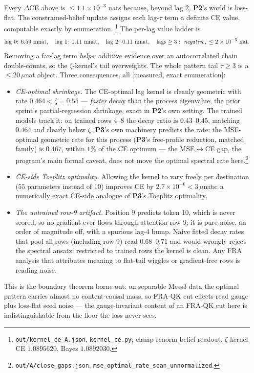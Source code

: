 \documentclass{article}
\newcommand{\htag}[1]{{\normalfont\sffamily\footnotesize[#1]}}
\newcommand{\Ptwo}{\textbf{P2}}
\newcommand{\Pthree}{\textbf{P3}}
\begin{document}
Every $\Delta$CE above is $\le1.1\times10^{-3}$ nats because, beyond lag 2, \Ptwo's
world is loss-flat. The constrained-belief update assigns each lag-$\tau$ term a
definite CE value, computable exactly by enumeration.%
\footnote{\texttt{out/kernel\_ce\_A.json}, \texttt{kernel\_ce.py}; clamp-renorm
belief readout. $\zeta$-kernel CE $1.0895620$, Bayes $1.0892030$.}
The per-lag value ladder is
\begin{equation}\label{eq:ladder}
\text{lag 0: } 6.59\text{ mnat},\quad
\text{lag 1: } 1.11\text{ mnat},\quad
\text{lag 2: } 0.11\text{ mnat},\quad
\text{lags}\ge3:\ \text{\emph{negative}},\ \le2\times10^{-5}\ \text{nat}.
\end{equation}
Removing a far-lag term \emph{helps}: additive evidence over an autocorrelated chain
double-counts, so the $\zeta$-kernel's tail overweights. The whole pattern tail
$\tau\ge3$ is a $\le20\,\mu$nat object. Three consequences, all
\htag{measured, exact enumeration}:
\begin{itemize}
\item \emph{CE-optimal shrinkage.} The CE-optimal lag kernel is cleanly geometric
with rate $0.464<\zeta=0.55$ --- \emph{faster} decay than the process eigenvalue,
the prior sprint's partial-regression shrinkage, exact in \Ptwo's own setting. The
trained models track it: on trained rows $4$--$8$ the decay ratio is $0.43$--$0.45$,
matching $0.464$ and clearly below $\zeta$. \Pthree's own machinery predicts the rate:
the MSE-optimal geometric rate for this process (\Pthree's free-profile reduction,
matched family) is $0.467$, within $1\%$ of the CE optimum --- the
MSE$\leftrightarrow$CE gap, the program's main formal caveat, does not move the optimal
spectral rate here.\footnote{\texttt{out/A/close\_gaps.json},
\texttt{mse\_optimal\_rate\_scan\_unnormalized}.}
\item \emph{CE-side Toeplitz optimality.} Allowing the kernel to vary freely per
destination ($55$ parameters instead of $10$) improves CE by
$2.7\times10^{-6}<3\,\mu$nats: a numerically exact CE-side analogue of \Pthree's
Toeplitz optimality.
\item \emph{The untrained row-9 artifact.} Position 9 predicts token 10, which is
never scored, so no gradient ever flows through attention row 9; it is pure noise, an
order of magnitude off, with a spurious lag-4 bump. Naive fitted decay rates that
pool all rows (including row 9) read $0.68$--$0.71$ and would wrongly reject the
spectral ansatz; restricted to trained rows the kernel is clean. Any FRA analysis
that attributes meaning to flat-tail wiggles or gradient-free rows is reading noise.
\end{itemize}
This is the boundary theorem borne out: on separable Mess3 data the optimal pattern
carries almost no content-causal mass, so FRA-QK cut effects read gauge plus
loss-flat seed noise --- the gauge-invariant content of an FRA-QK cut here is
indistinguishable from the floor the loss never sees.
\end{document}
